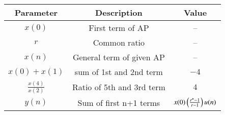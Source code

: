 \begin{tabular}{|c|c|c|}
      \hline
      Parameter & Description & Value\\\hline
      $x(0)$ & First term of AP & --\\\hline
      $r$ & Common ratio & --\\\hline
      $x(n)$ & General term of given AP & --\\\hline
      $x(0)+x(1)$ & sum of 1st and 2nd term & $-4$\\\hline
      $\displaystyle\frac{x(4)}{x(2)}$ & Ratio of 5th and 3rd term & $4$\\\hline
      $y(n)$ & Sum of first n+1 terms & $x(0)\left(\frac{r^n-1}{r-1}\right)u(n)$\\\hline
\end{tabular}
